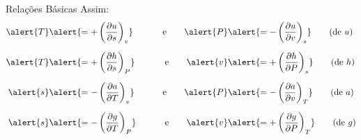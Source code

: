     \begin{frame}{Relações Básicas}\vspace*{-0em}
        Assim:
        \begin{alignat*}{2}
            \alert{T}         &\alert{=  +\left(\frac{\partial u}{\partial s}\right)_v}\qquad &
            \mbox{e}\qquad
            \alert{P}         &\alert{=  -\left(\frac{\partial u}{\partial v}\right)_s}\qquad
            \mbox{(de $u$)}   \\[\medskipamount]
            \alert{T}         &\alert{=  +\left(\frac{\partial h}{\partial s}\right)_P}\qquad &
            \mbox{e}\qquad
            \alert{v}         &\alert{=  +\left(\frac{\partial h}{\partial P}\right)_s}\qquad
            \mbox{(de $h$)}   \\[\medskipamount]
            \alert{s}         &\alert{=  -\left(\frac{\partial a}{\partial T}\right)_v}\qquad &
            \mbox{e}\qquad
            \alert{P}         &\alert{=  -\left(\frac{\partial a}{\partial v}\right)_T}\qquad
            \mbox{(de $a$)}   \\[\medskipamount]
            \alert{s}         &\alert{=  -\left(\frac{\partial g}{\partial T}\right)_P}\qquad &
            \mbox{e}\qquad
            \alert{v}         &\alert{=  +\left(\frac{\partial g}{\partial P}\right)_T}\qquad
            \mbox{(de $g$)}
        \end{alignat*}
    \end{frame}

